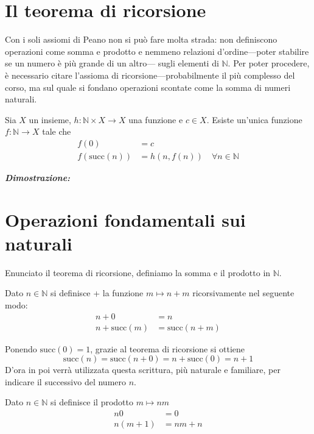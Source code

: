 \documentclass[oneside]{book}
\theoremstyle{remark}
\begin{document}
\section{Il teorema di ricorsione}
Con i soli assiomi di Peano non si può fare molta strada: non
definiscono operazioni come somma e prodotto e nemmeno relazioni
d'ordine—poter stabilire se un numero è più grande di un altro—
sugli elementi di $\mathbb{N}$. Per poter procedere, è necessario
citare l'assioma di ricorsione—probabilmente il più complesso del
corso, ma sul quale si fondano operazioni scontate come la somma
di numeri naturali.

\begin{tcolorbox}[title=Teorema di ricorsione]
Sia $X$ un insieme, $h:\mathbb{N}\times X\to X$ una funzione
e $c\in X$. Esiste un'unica funzione $f:\mathbb{N}\to X$ tale
che
\begin{align*}
    f(0) &= c\\
    f(\text{succ}(n)) &= h(n,f(n)) \quad \forall n \in\mathbb{N}
\end{align*}

\textit{\textbf{Dimostrazione:}}
\end{tcolorbox}


\section{Operazioni fondamentali sui naturali}
Enunciato il teorema di ricorsione, definiamo la somma e il prodotto
in $\mathbb{N}$.
\begin{tcolorbox}[colback=yellow!30, colframe=yellow!30!black, title={Somma in $\mathbb{N}$}]
Dato $n\in\mathbb{N}$ si definisce + la funzione $m\mapsto n+m$ ricorsivamente
nel seguente modo:
\begin{align*}
    n + 0 &= n\\
    n + \text{succ}(m) &= \text{succ}(n + m)
\end{align*}
\end{tcolorbox}

Ponendo $\text{succ}(0) = 1$, grazie al teorema di ricorsione si ottiene
\[ \text{succ}(n) = \text{succ}(n + 0) = n + \text{succ}(0) = n + 1 \]
D'ora in poi verrà utilizzata questa scrittura, più naturale e familiare,
per indicare il successivo del numero $n$.

\begin{tcolorbox}[colback=yellow!30, colframe=yellow!30!black, title={Prodotto in $\mathbb{N}$}]
Dato $n\in\mathbb{N}$ si definisce il prodotto $m\mapsto nm$
\begin{align*}
    n0 &= 0\\
    n(m+1) &= nm + n
\end{align*}
\end{tcolorbox}
\end{document}
